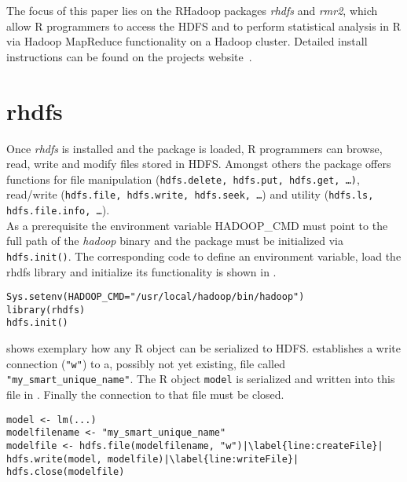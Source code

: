 The focus of this paper lies on the RHadoop packages \emph{rhdfs} and \emph{rmr2}, which allow R programmers to access the \ac{HDFS} and to perform statistical analysis in R via Hadoop MapReduce functionality on a Hadoop cluster. Detailed install instructions can be found on the projects website~\cite{rhadoop}.



\section{rhdfs}
Once \emph{rhdfs} is installed and the package is loaded, R programmers can browse, read, write and modify files stored in \ac{HDFS}. Amongst others the package offers functions for file manipulation (\texttt{hdfs.delete, hdfs.put, hdfs.get, \ldots{})}, read/write (\texttt{hdfs.file, hdfs.write, hdfs.seek, \ldots{}}) and utility (\texttt{hdfs.ls, hdfs.file.info, \ldots{}}). \\

As a prerequisite the environment variable HADOOP\_CMD must point to the full path of the \emph{hadoop} binary and the package must be initialized via \lstinline!hdfs.init()!. The corresponding code to define an environment variable, load the rhdfs library and initialize its functionality is shown in .

\begin{lstlisting}[breaklines=true, caption=Initialization of rhdfs., escapechar=|, label={lst:rhdfsInit}]
Sys.setenv(HADOOP_CMD="/usr/local/hadoop/bin/hadoop")
library(rhdfs)
hdfs.init()
\end{lstlisting}


 shows exemplary how any R object can be serialized to HDFS.  establishes a write connection (\lstinline!"w"!) to a, possibly not yet existing, file called \lstinline!"my_smart_unique_name"!. The R object \lstinline!model! is serialized and written into this file in . Finally the connection to that file must be closed.
\begin{lstlisting}[breaklines=true, caption=Serialization of an exemplary R object~\cite{rhadoop}., escapechar=|, label={lst:RObjSerialization}]
model <- lm(...)
modelfilename <- "my_smart_unique_name"
modelfile <- hdfs.file(modelfilename, "w")|\label{line:createFile}|
hdfs.write(model, modelfile)|\label{line:writeFile}|
hdfs.close(modelfile)
\end{lstlisting}

